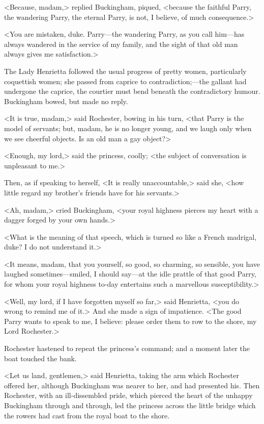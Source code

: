 <Because, madam,> replied Buckingham, piqued, <because the faithful Parry, the wandering Parry, the eternal Parry, is not, I believe, of much consequence.>

<You are mistaken, duke. Parry—the wandering Parry, as you call him—has always wandered in the service of my family, and the sight of that old man always gives me satisfaction.>

The Lady Henrietta followed the usual progress of pretty women, particularly coquettish women; she passed from caprice to contradiction;—the gallant had undergone the caprice, the courtier must bend beneath the contradictory humour. Buckingham bowed, but made no reply.

<It is true, madam,> said Rochester, bowing in his turn, <that Parry is the model of servants; but, madam, he is no longer young, and we laugh only when we see cheerful objects. Is an old man a gay object?>

<Enough, my lord,> said the princess, coolly; <the subject of conversation is unpleasant to me.>

Then, as if speaking to herself, <It is really unaccountable,> said she, <how little regard my brother's friends have for his servants.>

<Ah, madam,> cried Buckingham, <your royal highness pierces my heart with a dagger forged by your own hands.>

<What is the meaning of that speech, which is turned so like a French madrigal, duke? I do not understand it.>

<It means, madam, that you yourself, so good, so charming, so sensible, you have laughed sometimes—smiled, I should say—at the idle prattle of that good Parry, for whom your royal highness to-day entertains such a marvellous susceptibility.>

<Well, my lord, if I have forgotten myself so far,> said Henrietta, <you do wrong to remind me of it.> And she made a sign of impatience. <The good Parry wants to speak to me, I believe: please order them to row to the shore, my Lord Rochester.>

Rochester hastened to repeat the princess's command; and a moment later the boat touched the bank.

<Let us land, gentlemen,> said Henrietta, taking the arm which Rochester offered her, although Buckingham was nearer to her, and had presented his. Then Rochester, with an ill-dissembled pride, which pierced the heart of the unhappy Buckingham through and through, led the princess across the little bridge which the rowers had cast from the royal boat to the shore.

